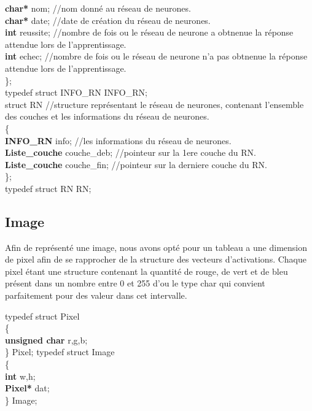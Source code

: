 \documentclass{article}
\newcommand\tab[1][1cm]{\hspace*{#1}}
\begin{document}
\begin{flushleft}
			\tab \textcolor{myblue}{\textbf{char*}} nom;	//nom donné au réseau de neurones.\\
			\tab \textcolor{myblue}{\textbf{char*}} date;	//date de création du réseau de neurones.\\
			\tab \textcolor{myblue}{\textbf{int}} reussite;	//nombre de fois ou le réseau de neurone a obtnenue la réponse attendue lors de l'apprentissage.\\
			\tab \textcolor{myblue}{\textbf{int}} echec;	//nombre de fois ou le réseau de neurone n'a pas obtnenue la réponse attendue lors de l'apprentissage.\\
		\};\\
		\bigbreak
		typedef struct INFO\_RN INFO\_RN;\\
		\bigbreak
		struct RN	//structure représentant le réseau de neurones, contenant l'ensemble des couches et les informations du réseau de neurones.\\
		\{\\
			\tab \textcolor{myblue}{\textbf{INFO\_RN}} info;	//les informations du réseau de neurones.\\
			\tab \textcolor{myblue}{\textbf{Liste\_couche}} couche\_deb;	//pointeur sur la 1ere couche du RN.\\
			\tab \textcolor{myblue}{\textbf{Liste\_couche}} couche\_fin;    //pointeur sur la derniere couche du RN.\\
		\};\\
		\bigbreak
		typedef struct RN RN;
		
	\end{flushleft}
	
	\subsection{Image}
	Afin de représenté une image, nous avons opté pour un tableau a une dimension de pixel afin de se rapprocher de la structure des vecteurs d'activations. Chaque pixel étant une structure contenant la quantité de rouge, de vert et de bleu présent dans un nombre entre 0 et 255 d'ou le type char qui convient parfaitement pour des valeur dans cet intervalle.
	\begin{flushleft}
		typedef struct Pixel\\
			\{\\
				\tab \textcolor{myblue}{\textbf{unsigned char}} r,g,b;\\
			\} Pixel;
		\bigbreak
		typedef struct Image\\
			\{\\
				\tab \textcolor{myblue}{\textbf{int}} w,h;\\
				\tab \textcolor{myblue}{\textbf{Pixel*}} dat;\\
			\} Image;
	\end{flushleft}
	\newpage
	
\end{document}

